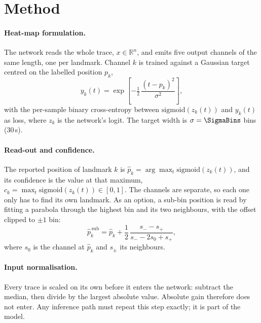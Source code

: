\documentclass[11pt,a4paper]{article}
\newcommand{\us}{\,\textmu s}
\begin{document}
\section{Method}
\label{sec:method}

\paragraph{Heat-map formulation.}
The network reads the whole trace, $x \in \mathbb{R}^{n}$, and emits five output channels of the same
length, one per landmark. Channel $k$ is trained against a Gaussian target centred on the labelled
position $p_k$,
\begin{equation}
  y_k(t) = \exp\!\left[-\tfrac{1}{2}\,\frac{(t-p_k)^2}{\sigma^2}\right],
\end{equation}
with the per-sample binary cross-entropy between $\mathrm{sigmoid}(z_k(t))$ and $y_k(t)$ as loss, where
$z_k$ is the network's logit. The target width is $\sigma = \SigmaBins$ bins (30\us).

\paragraph{Read-out and confidence.}
The reported position of landmark $k$ is $\hat p_k = \arg\max_t \mathrm{sigmoid}(z_k(t))$, and its
confidence is the value at that maximum, $c_k = \max_t \mathrm{sigmoid}(z_k(t)) \in [0,1]$. The channels
are separate, so each one only has to find its own landmark. As an option, a sub-bin position is read by
fitting a parabola through the highest bin and its two neighbours, with the offset clipped to $\pm 1$ bin:
\begin{equation}
  \hat p_k^{\,\mathrm{sub}} = \hat p_k + \frac{1}{2}\,\frac{s_{-}-s_{+}}{s_{-}-2s_0+s_{+}},
\end{equation}
where $s_0$ is the channel at $\hat p_k$ and $s_\pm$ its neighbours.

\paragraph{Input normalisation.}
Every trace is scaled on its own before it enters the network: subtract the median, then divide by the
largest absolute value. Absolute gain therefore does not enter. Any inference path must repeat this step
exactly; it is part of the model.
\end{document}
